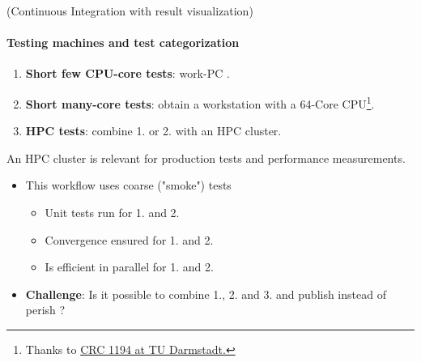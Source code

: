\documentclass[
	aspectratio=169,%
	color={accentcolor=2d},
	logo=true,%
	colorframetitle=true,%
	]{tudabeamer}
\begin{document}
\begin{frame}{(Continuous Integration with result visualization)} 
    \framesubtitle{Testing machines and test categorization}

    \vfill
    \begin{enumerate}
        \item \textbf{Short few CPU-core tests}: work-PC \faGraduationCap.    
        \item \textbf{Short many-core tests}: obtain a workstation with a 64-Core CPU\footnote{Thanks to \href{https://www.sfb1194.tu-darmstadt.de/index.en.jsp}{CRC 1194 at TU Darmstadt.}}\faGraduationCap.
        \item \textbf{HPC tests}: combine 1. or 2. with an HPC cluster. 
    \end{enumerate}

    An HPC cluster is relevant for production tests and performance measurements.
    \begin{itemize}
        \item This workflow uses coarse ("smoke") tests \faGraduationCap
            \begin{itemize}
                \item Unit tests run for 1. and 2.
                \item Convergence ensured for 1. and 2.
                \item Is efficient in parallel for 1. and 2. 
            \end{itemize}
        \item \textbf{Challenge}: Is it possible to combine 1., 2. and 3. and publish instead of perish \faGraduationCap?
    \end{itemize}

\end{frame}
\end{document}

